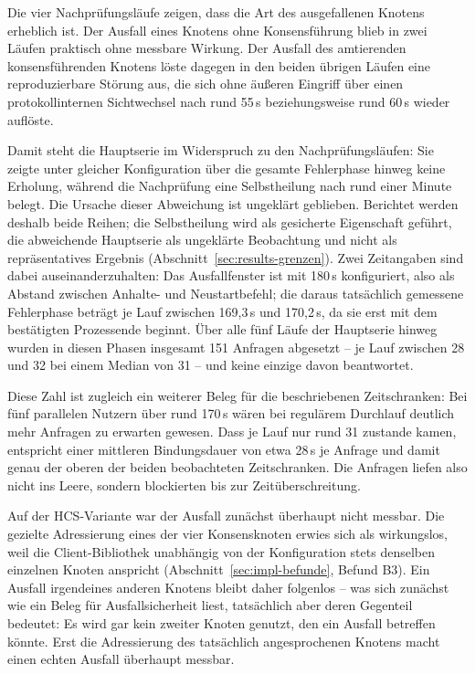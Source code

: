 Die vier Nachprüfungsläufe zeigen, dass die Art des ausgefallenen Knotens erheblich ist. Der Ausfall eines Knotens ohne Konsensführung blieb in zwei Läufen praktisch ohne messbare Wirkung. Der Ausfall des amtierenden konsensführenden Knotens löste dagegen in den beiden übrigen Läufen eine reproduzierbare Störung aus, die sich ohne äußeren Eingriff über einen protokollinternen Sichtwechsel nach rund 55\,s beziehungsweise rund 60\,s wieder auflöste.

Damit steht die Hauptserie im Widerspruch zu den Nachprüfungsläufen: Sie zeigte unter gleicher Konfiguration über die gesamte Fehlerphase hinweg keine Erholung, während die Nachprüfung eine Selbstheilung nach rund einer Minute belegt. Die Ursache dieser Abweichung ist ungeklärt geblieben. Berichtet werden deshalb beide Reihen; die Selbstheilung wird als gesicherte Eigenschaft geführt, die abweichende Hauptserie als ungeklärte Beobachtung und nicht als repräsentatives Ergebnis (Abschnitt~\ref{sec:results-grenzen}). Zwei Zeitangaben sind dabei auseinanderzuhalten: Das Ausfallfenster ist mit 180\,s konfiguriert, also als Abstand zwischen Anhalte- und Neustartbefehl; die daraus tatsächlich gemessene Fehlerphase beträgt je Lauf zwischen 169,3\,s und 170,2\,s, da sie erst mit dem bestätigten Prozessende beginnt. Über alle fünf Läufe der Hauptserie hinweg wurden in diesen Phasen insgesamt 151 Anfragen abgesetzt -- je Lauf zwischen 28 und 32 bei einem Median von 31 -- und keine einzige davon beantwortet.

Diese Zahl ist zugleich ein weiterer Beleg für die beschriebenen Zeitschranken: Bei fünf parallelen Nutzern über rund 170\,s wären bei regulärem Durchlauf deutlich mehr Anfragen zu erwarten gewesen. Dass je Lauf nur rund 31 zustande kamen, entspricht einer mittleren Bindungsdauer von etwa 28\,s je Anfrage und damit genau der oberen der beiden beobachteten Zeitschranken. Die Anfragen liefen also nicht ins Leere, sondern blockierten bis zur Zeitüberschreitung.

Auf der HCS-Variante war der Ausfall zunächst überhaupt nicht messbar. Die gezielte Adressierung eines der vier Konsensknoten erwies sich als wirkungslos, weil die Client-Bibliothek unabhängig von der Konfiguration stets denselben einzelnen Knoten anspricht (Abschnitt~\ref{sec:impl-befunde}, Befund B3). Ein Ausfall irgendeines anderen Knotens bleibt daher folgenlos -- was sich zunächst wie ein Beleg für Ausfallsicherheit liest, tatsächlich aber deren Gegenteil bedeutet: Es wird gar kein zweiter Knoten genutzt, den ein Ausfall betreffen könnte. Erst die Adressierung des tatsächlich angesprochenen Knotens macht einen echten Ausfall überhaupt messbar.

